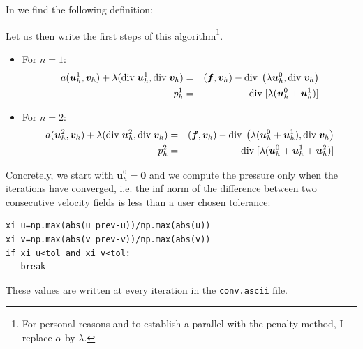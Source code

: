 In \textcite{zhan09} we find the following definition:
\begin{center}
\end{center}

Let us then write the first steps of this algorithm\footnote{For personal reasons
and to establish a parallel with the penalty method, I replace $\alpha$ by $\lambda$.}.
\begin{itemize}
\item
For $n=1$:
\begin{eqnarray}
a({\bm u}_h^1,{\bm v}_h) + \lambda (\text{div}\; {\bm u}_h^1, \text{div}\; {\bm v}_h) 
&=& ({\bm f} , {\bm v}_h) - \text{div}\; \left( \lambda {\bm u}_h^0 , \text{div}\; {\bm v}_h \right) \nonumber\\
p_h^1 &=& - \text{div}\; [\lambda ( {\bm u}_h^0 + {\bm u}_h^1 )]
\end{eqnarray}
\item 
For $n=2$:
\begin{eqnarray}
a({\bm u}_h^2,{\bm v}_h) + \lambda (\text{div}\; {\bm u}_h^2, \text{div}\; {\bm v}_h) 
&=& ({\bm f} , {\bm v}_h) - \text{div}\; \left( \lambda ({\bm u}_h^0 +{\bm u}_h^1 ), \text{div}\; {\bm v}_h \right) \nonumber\\
p_h^2 &=& - \text{div}\; [\lambda ( {\bm u}_h^0 + {\bm u}_h^1 + {\bm u}_h^2)]
\end{eqnarray}
\end{itemize}

Concretely, we start with ${\bm u}_h^0={\bm 0}$ and we compute the pressure only when the 
iterations have converged, i.e. the inf norm of the difference between two consecutive 
velocity fields is less than a user chosen tolerance:
\begin{lstlisting}
xi_u=np.max(abs(u_prev-u))/np.max(abs(u))
xi_v=np.max(abs(v_prev-v))/np.max(abs(v))
if xi_u<tol and xi_v<tol:
   break
\end{lstlisting}
These values are written at every iteration in the {\tt conv.ascii} file.

